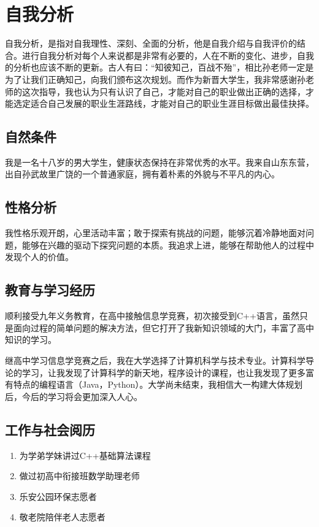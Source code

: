 \documentclass{article}
\begin{document}
\thispagestyle{empty}
\newpage
\setcounter{page}{1}
\section{自我分析}
	自我分析，是指对自我理性、深刻、全面的分析，他是自我介绍与自我评价的结合。进行自我分析对每个人来说都是非常有必要的，人在不断的变化、进步，自我的分析也应该不断的更新。古人有曰：“知彼知己，百战不殆”，相比孙老师一定是为了让我们正确知己，向我们颁布这次规划。而作为新晋大学生，我非常感谢孙老师的这次指导，我也认为只有认识了自己，才能对自己的职业做出正确的选择，才能选定适合自己发展的职业生涯路线，才能对自己的职业生涯目标做出最佳抉择。\par

\subsection{自然条件}
我是一名十八岁的男大学生，健康状态保持在非常优秀的水平。我来自山东东营，出自孙武故里广饶的一个普通家庭，拥有着朴素的外貌与不平凡的内心。\par

\subsection{性格分析}
我性格乐观开朗，心里活动丰富；敢于探索有挑战的问题，能够沉着冷静地面对问题，能够在兴趣的驱动下探究问题的本质。我追求上进，能够在帮助他人的过程中发现个人的价值。\par

\subsection{教育与学习经历}
顺利接受九年义务教育，在高中接触信息学竞赛，初次接受到C++语言，虽然只是面向过程的简单问题的解决方法，但它打开了我新知识领域的大门，丰富了高中知识的学习。\par
继高中学习信息学竞赛之后，我在大学选择了计算机科学与技术专业。计算科学导论的学习，让我发现了计算科学的新天地，程序设计的课程，也让我发现了更多富有特点的编程语言（Java，Python）。大学尚未结束，我相信大一构建大体规划后，今后的学习将会更加深入人心。\par

\subsection{工作与社会阅历}
\begin{enumerate}[(1)]
	\item 为学弟学妹讲过C++基础算法课程
	\item 做过初高中衔接班数学助理老师
	\item 乐安公园环保志愿者
	\item 敬老院陪伴老人志愿者
\end{enumerate}
\par
\end{document}
